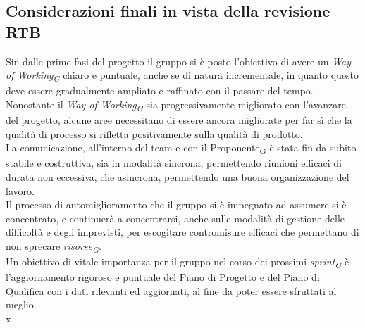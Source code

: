 \subsection{Considerazioni finali in vista della revisione RTB}
Sin dalle prime fasi del progetto il gruppo si è posto l'obiettivo di avere un \textit{Way of Working\textsubscript{G}} chiaro e puntuale, anche se di natura incrementale, in quanto questo deve essere gradualmente ampliato e raffinato con il passare del tempo. Nonostante il \textit{Way of Working\textsubscript{G}} sia progressivamente migliorato con l’avanzare del progetto, alcune aree necessitano di essere ancora migliorate per far sì che la qualità di processo si rifletta positivamente sulla qualità di prodotto. \\
La comunicazione, all'interno del team e con il Proponente\textsubscript{G} è stata fin da subito stabile e costruttiva, sia in modalità sincrona, permettendo riunioni efficaci di durata non eccessiva, che asincrona, permettendo una buona organizzazione del lavoro. \\
Il processo di automiglioramento che il gruppo si è impegnato ad assumere si è concentrato, e continuerà a concentrarsi, anche sulle modalità di gestione delle difficoltà e degli imprevisti, per escogitare contromisure efficaci che permettano di non sprecare \textit{risorse\textsubscript{G}}. \\
Un obiettivo di vitale importanza per il gruppo nel corso dei prossimi \textit{sprint\textsubscript{G}} è l'aggiornamento rigoroso e puntuale del Piano di Progetto e del Piano di Qualifica con i dati rilevanti ed aggiornati, al fine da poter essere sfruttati al meglio. \\
x